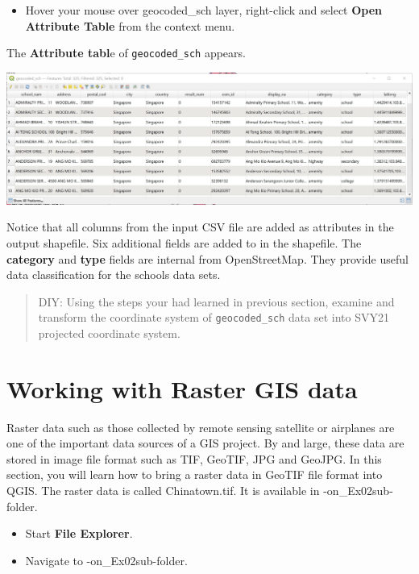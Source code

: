 \documentclass[
  letterpaper,
  DIV=11,
  numbers=noendperiod]{scrreprt}
\providecommand{\tightlist}{%
  \setlength{\itemsep}{0pt}\setlength{\parskip}{0pt}}\usepackage{longtable,booktabs,array}
\begin{document}
\begin{itemize}
\tightlist
\item
  Hover your mouse over geocoded\_sch layer, right-click and select
  \textbf{Open Attribute Table} from the context menu.
\end{itemize}

The \textbf{Attribute tabl}e of \texttt{geocoded\_sch} appears.

\includegraphics{./img02/image24.jpg}

Notice that all columns from the input CSV file are added as attributes
in the output shapefile. Six additional fields are added to in the
shapefile. The \textbf{category} and \textbf{type} fields are internal
from OpenStreetMap. They provide useful data classification for the
schools data sets.

\begin{quote}
DIY: Using the steps your had learned in previous section, examine and
transform the coordinate system of \texttt{geocoded\_sch} data set into
SVY21 projected coordinate system.
\end{quote}

\hypertarget{working-with-raster-gis-data}{%
\section{Working with Raster GIS
data}\label{working-with-raster-gis-data}}

Raster data such as those collected by remote sensing satellite or
airplanes are one of the important data sources of a GIS project. By and
large, these data are stored in image file format such as TIF, GeoTIF,
JPG and GeoJPG. In this section, you will learn how to bring a raster
data in GeoTIF file format into QGIS. The raster data is called
Chinatown.tif. It is available in
\Hands-on\_Ex02\data\RasterData sub-folder.

\begin{itemize}
\tightlist
\item
  Start \textbf{File Explorer}.
\item
  Navigate to \Hands-on\_Ex02\data\RasterData sub-folder.
\end{itemize}
\end{document}
